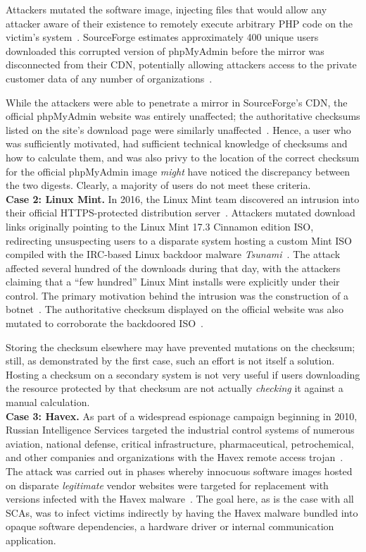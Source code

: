 Attackers mutated the software image, injecting files that would allow any
attacker aware of their existence to remotely execute arbitrary PHP code on the
victim's system~\cite{SCA-PMA1}. SourceForge estimates approximately 400 unique
users downloaded this corrupted version of phpMyAdmin before the mirror was
disconnected from their CDN, potentially allowing attackers access to the
private customer data of any number of organizations~\cite{SCA-PMA2}.

While the attackers were able to penetrate a mirror in SourceForge's CDN, the
official phpMyAdmin website was entirely unaffected; the authoritative checksums
listed on the site's download page were similarly unaffected~\cite{SCA-PMA2}.
Hence, a user who was sufficiently motivated, had sufficient technical knowledge
of checksums and how to calculate them, and was also privy to the location of
the correct checksum for the official phpMyAdmin image \emph{might} have
noticed the discrepancy between the two digests. Clearly, a majority of users do
not meet these criteria. \\

\noindent\textbf{Case 2: Linux Mint.} In 2016, the Linux Mint team discovered an
intrusion into their official HTTPS-protected distribution
server~\cite{SCA-MINT1}. Attackers mutated download links originally pointing to
the Linux Mint 17.3 Cinnamon edition ISO, redirecting unsuspecting users to a
disparate system hosting a custom Mint ISO compiled with the IRC-based Linux
backdoor malware \emph{Tsunami}~\cite{SCA-MINT2}. The attack affected several
hundred of the downloads during that day, with the attackers claiming that a
``few hundred'' Linux Mint installs were explicitly under their control. The
primary motivation behind the intrusion was the construction of a
botnet~\cite{SCA-MINT3}. The authoritative checksum displayed on the official
website was also mutated to corroborate the backdoored ISO~\cite{SCA-MINT3}.

Storing the checksum elsewhere may have prevented mutations on the checksum;
still, as demonstrated by the first case, such an effort is not itself a
solution. Hosting a checksum on a secondary system is not very useful if users
downloading the resource protected by that checksum are not actually
\emph{checking} it against a manual calculation. \\

\noindent\textbf{Case 3: Havex.} As part of a widespread espionage campaign
beginning in 2010, Russian Intelligence Services targeted the industrial control
systems of numerous aviation, national defense, critical infrastructure,
pharmaceutical, petrochemical, and other companies and organizations with the
Havex remote access trojan~\cite{SCA-HAVEX1, SCA-HAVEX2}. The attack was carried
out in phases whereby innocuous software images hosted on disparate
\emph{legitimate} vendor websites were targeted for replacement with versions
infected with the Havex malware~\cite{SCA-HAVEX2}. The goal here, as is the case
with all SCAs, was to infect victims indirectly by having the Havex malware
bundled into opaque software dependencies, \ie a hardware driver or internal
communication application.


